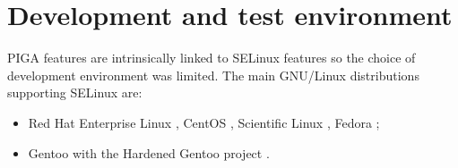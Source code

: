 \documentclass[pdftex,a4paper,titlepage,11pt]{article}
\begin{document}
%

%
%
%

\newpage

\section{Development and test environment}

PIGA features are intrinsically linked to SELinux features so the choice of development environment was limited. The main GNU/Linux distributions supporting SELinux are:

\begin{itemize}
	\item Red Hat Enterprise Linux \cite{RHEL}, CentOS \cite{CENTOS}, Scientific Linux \cite{SL}, Fedora \cite{FEDORA};
	\item Gentoo \cite{GENTOO} with the Hardened Gentoo project \cite{GENTOOH}.
\end{itemize}
\end{document}
